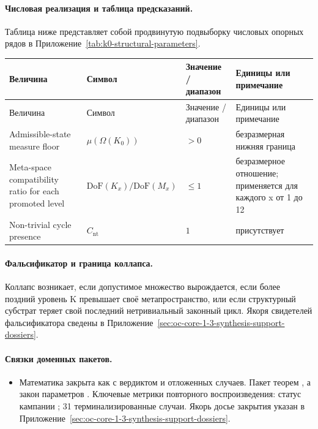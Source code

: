 \paragraph{Числовая реализация и таблица предсказаний.}
Таблица ниже представляет собой продвинутую подвыборку числовых опорных рядов в Приложение~\ref{tab:k0-structural-parameters}.
\begin{longtable}{@{}L{0.27\textwidth}L{0.15\textwidth}L{0.24\textwidth}L{0.16\textwidth}@{}}
\toprule
Величина & Символ & Значение / диапазон & Единицы или примечание \\
\midrule
\endfirsthead
\toprule
Величина & Символ & Значение / диапазон & Единицы или примечание \\
\midrule
\endhead
Admissible-state measure floor & $\scriptstyle \mu(\Omega(K_0))$ & $> 0$ & безразмерная нижняя граница \\
Meta-space compatibility ratio for each promoted level & $\scriptstyle \mathrm{DoF}(K_x)/\allowbreak \mathrm{DoF}(M_x)$ & $\leq 1$ & безразмерное отношение; применяется для каждого x от 1 до 12 \\
Non-trivial cycle presence & $\scriptstyle C_{\mathrm{nt}}$ & $1$ & присутствует \\
\bottomrule
\end{longtable}

\paragraph{Фальсификатор и граница коллапса.}
Коллапс возникает, если допустимое множество вырождается, если более поздний уровень K превышает своё метапространство, или если структурный субстрат теряет свой последний нетривиальный законный цикл.
Якоря свидетелей фальсификатора сведены в Приложение~\ref{sec:oc-core-1-3-synthesis-support-dossiers}.

\paragraph{Связки доменных пакетов.}
\begin{itemize}[leftmargin=1.6em,nosep]
\item Математика закрыта как  с вердиктом  и  отложенных случаев. Пакет теорем , а закон параметров . Ключевые метрики повторного воспроизведения: статус кампании ; 31 терминализированные случаи. Якорь досье закрытия указан в Приложение~\ref{sec:oc-core-1-3-synthesis-support-dossiers}.
\end{itemize}

